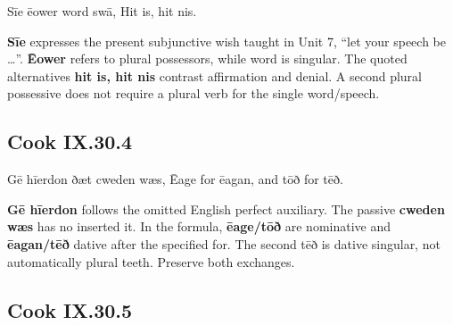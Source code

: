 \par\begin{minipage}{\linewidth}\raggedright
Sīe ēower word swā, Hit is, hit nis.

\textbf{Sīe} expresses the present subjunctive wish taught in Unit 7, “let your speech be …”. \textbf{Ēower} refers to plural possessors, while word is singular. The quoted alternatives \textbf{hit is, hit nis} contrast affirmation and denial. A second plural possessive does not require a plural verb for the single word/\allowbreak{}speech.

\end{minipage}\par\addvspace{4pt}

\subsection*{Cook IX.30.4}

\par\begin{minipage}{\linewidth}\raggedright
Gē hīerdon ðæt cweden wæs, Ēage for ēagan, and tōð for tēð.

\textbf{Gē hīerdon} follows the omitted English perfect auxiliary. The passive \textbf{cweden wæs} has no inserted it. In the formula, \textbf{ēage/\allowbreak{}tōð} are nominative and \textbf{ēagan/\allowbreak{}tēð} dative after the specified for. The second tēð is dative singular, not automatically plural teeth. Preserve both exchanges.

\end{minipage}\par\addvspace{4pt}

\subsection*{Cook IX.30.5}

